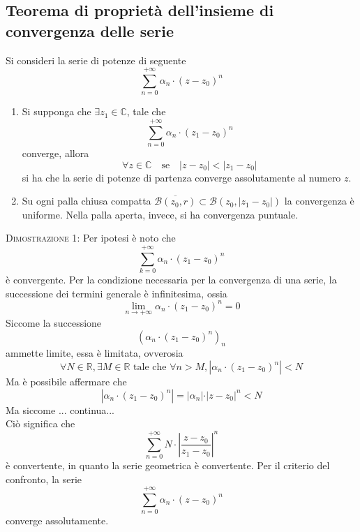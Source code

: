 \documentclass[a4paper]{extarticle}
\begin{document}
\subsection{Teorema di proprietà dell'insieme di convergenza delle serie}
Si consideri la serie di potenze di seguente
\[\sum_{n=0}^{+\infty} \alpha_n \cdot (z-z_0)^n\]
\begin{enumerate}
    \item Si supponga che $\exists z_1 \in \mathbb{C}$, tale che
    \[\sum_{n=0}^{+\infty} \alpha_n \cdot (z_1-z_0)^n\]
    converge, allora
    \[\forall z \in \mathbb{C} \hspace{1em} \text{se} \hspace{1em} \left \vert z - z_0 \right \vert < \left \vert z_1 - z_0 \right \vert\]
    si ha che la serie di potenze di partenza converge assolutamente al numero $z$.

    \item Su ogni palla chiusa compatta $\overline{\mathcal{B}(z_0,r)} \subset \mathcal{B}(z_0,\left \vert z_1-z_0 \right \vert)$ la convergenza è uniforme. Nella palla aperta, invece, si ha convergenza puntuale.
\end{enumerate}

\vspace{2em}
\noindent
\normalfont \normalsize
\textsc{Dimostrazione 1}: Per ipotesi è noto che
\[\sum_{k=0}^{+\infty} \alpha_n \cdot (z_1-z_0)^n\]
è convergente. Per la condizione necessaria per la convergenza di una serie, la successione dei termini generale è infinitesima, ossia
\[\lim_{n \to +\infty} \alpha_n \cdot (z_1-z_0)^n = 0\]
Siccome la successione 
\[\left(\alpha_n \cdot (z_1 - z_0)^n \right)_n\]
ammette limite, essa è limitata, ovverosia
\[\forall N \in \mathbb{R}, \exists M \in \mathbb{R} \text{ tale che } \forall n > M, \left \vert \alpha_n \cdot (z_1-z_0)^n \right \vert < N \]
Ma è possibile affermare che 
\[\left \vert \alpha_n \cdot (z_1-z_0)^n \right \vert = \vert \alpha_n \vert \cdot \vert z-z_0 \vert^n < N\]
Ma siccome ... continua...\\
Ciò significa che
\[\sum_{n=0}^{+\infty} N \cdot \left \vert \frac{z-z_0}{z_1-z_0} \right \vert^n\]
è convertente, in quanto la serie geometrica è convertente. Per il criterio del confronto, la serie
\[\sum_{n=0}^{+\infty} \alpha_n \cdot (z-z_0)^n\]
converge assolutamente.
\end{document}
